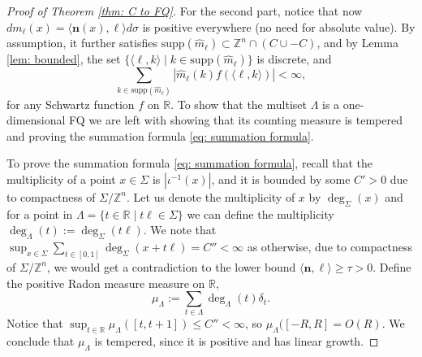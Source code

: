 \documentclass[11pt,letterpaper]{amsart}
\theoremstyle{definition}
\theoremstyle{plain}
\newcommand{\nfield}{\mathbf n}
\newcommand{\R}{{\mathbb R}}
\newcommand{\Z}{{\mathbb Z}}
\begin{document}
\begin{proof}[Proof of Theorem \ref{thm: C to FQ}]
For the second part, notice that now $dm_{\ell}(x)=\langle\nfield(x),\ell\rangle d\sigma$ is positive everywhere (no need for absolute value). By assumption, it further satisfies $\mathrm{supp}(\widehat{m}_{\ell})\subset \Z^n\cap\left(C\cup-C\right)$, and by Lemma \ref{lem: bounded}, the set $\{\langle\ell,k\rangle\mid k\in\mathrm{supp}(\widehat{m}_{\ell})\}$ is discrete, and 
\[\sum_{k\in\mathrm{supp}(\widehat{m}_{\ell})}|\widehat{m}_{\ell}(k)f(\langle\ell,k\rangle)|<\infty,\]
for any Schwartz function $f$ on $\R$. To show that the multiset $\Lambda$ is a one-dimensional FQ we are left with showing that its counting measure is tempered and proving the summation formula \eqref{eq: summation formula}.

To prove the summation formula \eqref{eq: summation formula}, recall that the multiplicity of a point $x\in\Sigma$ is $|\iota^{-1}(x)|$, and it is bounded by some $C'>0$ due to compactness of $\Sigma/\Z^n$. 
Let us denote the multiplicity of $x$ by $\deg_{\Sigma}(x)$ and for a point in $\Lambda=\{t\in\R\mid t\ell\in\Sigma\}$ we can define the multiplicity $\deg_{\Lambda}(t):=\deg_{\Sigma}(t\ell)$. We note that $\sup_{x\in\Sigma}\sum_{t\in[0,1]}\deg_{\Sigma}(x+t\ell)=C''<\infty$ as otherwise, due to compactness of $\Sigma/\Z^n$, we would get a contradiction to the lower bound $\langle\nfield,\ell\rangle\ge\tau>0$. 
Define the positive Radon measure measure on $\R$,
\[\mu_{\Lambda}:=\sum_{t\in\Lambda}\deg_{\Lambda}(t)\delta_{t}.\]
Notice that $\sup_{t\in\R}\mu_{\Lambda}([t,t+1])\le C''<\infty$, so $\mu_{\Lambda}([-R,R]=O(R)$. We conclude that $\mu_{\Lambda}$ is tempered, since it is positive and has linear growth. 



\end{proof}
\end{document}
